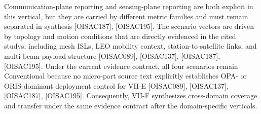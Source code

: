 \markdownRendererUlItem Communication-plane reporting and sensing-plane reporting are both explicit in this vertical, but they are carried by different metric families and must remain separated in synthesis [O\markdownRendererUnderscore{}ISAC\markdownRendererUnderscore{}187], [O\markdownRendererUnderscore{}ISAC\markdownRendererUnderscore{}195].\markdownRendererUlItemEnd 
\markdownRendererUlItem The scenario vectors are driven by topology and motion conditions that are directly evidenced in the cited studys, including mesh ISLs, LEO mobility context, station-to-satellite links, and multi-beam payload structure [O\markdownRendererUnderscore{}ISAC\markdownRendererUnderscore{}089], [O\markdownRendererUnderscore{}ISAC\markdownRendererUnderscore{}137], [O\markdownRendererUnderscore{}ISAC\markdownRendererUnderscore{}187], [O\markdownRendererUnderscore{}ISAC\markdownRendererUnderscore{}195].\markdownRendererUlItemEnd 
\markdownRendererUlItem Under the current evidence contract, all four scenarios remain Conventional because no micro-part source text explicitly establishes OPA- or ORIS-dominant deployment control for VII-E [O\markdownRendererUnderscore{}ISAC\markdownRendererUnderscore{}089], [O\markdownRendererUnderscore{}ISAC\markdownRendererUnderscore{}137], [O\markdownRendererUnderscore{}ISAC\markdownRendererUnderscore{}187], [O\markdownRendererUnderscore{}ISAC\markdownRendererUnderscore{}195].\markdownRendererUlItemEnd 
\markdownRendererUlEndTight \markdownRendererInterblockSeparator
{}Consequently, VII-F synthesizes cross-domain coverage and transfer under the same evidence contract after the domain-specific verticals.\markdownRendererParagraphSeparator
{}
\markdownRendererSectionEnd 
\markdownRendererSectionEnd \markdownRendererSectionBegin
{}\markdownRendererInterblockSeparator
{}\markdownRendererSectionBegin
{}\markdownRendererInterblockSeparator
